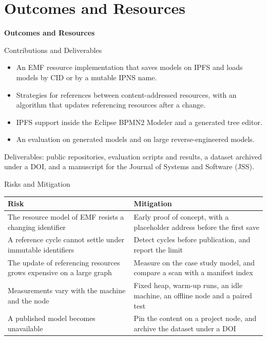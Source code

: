 \documentclass[aspectratio=169, table, 12pt]{beamer}
\begin{document}
\section{Outcomes and Resources}

\begin{frame}{\hfill}
  \centering
  \Huge{\textbf{Outcomes and Resources}}
\end{frame}

\begin{frame}{{\Large Contributions and Deliverables}}
  \vspace{8pt}
  \begin{itemize}
    \item An EMF resource implementation that saves models on IPFS and loads
          models by CID or by a mutable IPNS name.
    \item Strategies for references between content-addressed resources,
          with an algorithm that updates referencing resources after a change.
    \item IPFS support inside the Eclipse BPMN2 Modeler and a generated tree
          editor.
    \item An evaluation on generated models and on large reverse-engineered
          models.
  \end{itemize}
  \vspace{6pt}
  {\footnotesize Deliverables: public repositories, evaluation scripts and
  results, a dataset archived under a DOI, and a manuscript for the Journal of
  Systems and Software (JSS).}
\end{frame}

\begin{frame}{{\Large Risks and Mitigation}}
  \vspace{14pt}
  {\centering\footnotesize
  \begin{tabularx}{\textwidth}{@{}YY@{}}
    \toprule
    \textbf{Risk} & \textbf{Mitigation} \\
    \midrule
    The resource model of EMF resists a changing identifier &
      Early proof of concept, with a placeholder address before the first save \\
    A reference cycle cannot settle under immutable identifiers &
      Detect cycles before publication, and report the limit \\
    The update of referencing resources grows expensive on a large graph &
      Measure on the case study model, and compare a scan with a manifest index \\
    Measurements vary with the machine and the node &
      Fixed heap, warm-up runs, an idle machine, an offline node and a paired test \\
    A published model becomes unavailable &
      Pin the content on a project node, and archive the dataset under a DOI \\
    \bottomrule
  \end{tabularx}\par}
\end{frame}
\end{document}
